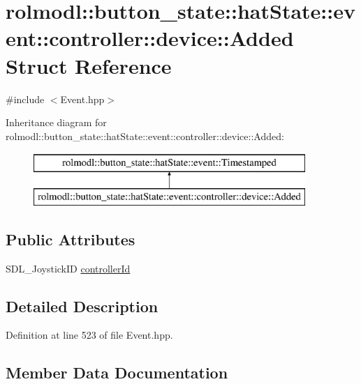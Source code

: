 \hypertarget{structrolmodl_1_1button__state_1_1hat_state_1_1event_1_1controller_1_1device_1_1_added}{}\section{rolmodl\+::button\+\_\+state\+::hat\+State\+::event\+::controller\+::device\+::Added Struct Reference}
\label{structrolmodl_1_1button__state_1_1hat_state_1_1event_1_1controller_1_1device_1_1_added}


{\ttfamily \#include $<$Event.\+hpp$>$}

Inheritance diagram for rolmodl\+::button\+\_\+state\+::hat\+State\+::event\+::controller\+::device\+::Added\+:\begin{figure}[H]
\begin{center}
\leavevmode
\includegraphics[height=2.000000cm]{structrolmodl_1_1button__state_1_1hat_state_1_1event_1_1controller_1_1device_1_1_added}
\end{center}
\end{figure}
\subsection*{Public Attributes}
\begin{DoxyCompactItemize}
\item 
S\+D\+L\+\_\+\+Joystick\+ID \mbox{\hyperlink{structrolmodl_1_1button__state_1_1hat_state_1_1event_1_1controller_1_1device_1_1_added_ad687d9c130df3fc54d6229607e32a2f2}{controller\+Id}}
\end{DoxyCompactItemize}


\subsection{Detailed Description}


Definition at line 523 of file Event.\+hpp.



\subsection{Member Data Documentation}
\mbox{\label{structrolmodl_1_1button__state_1_1hat_state_1_1event_1_1controller_1_1device_1_1_added_ad687d9c130df3fc54d6229607e32a2f2}} 
